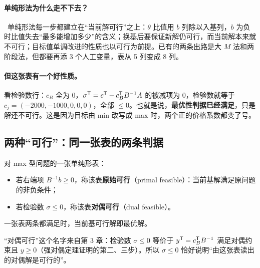 \paragraph{单纯形法为什么走不下去？}\ 单纯形法每一步都建立在“当前解可行”之上：$\theta$ 比值用 $b$ 列除以入基列，$b$ 为负时比值失去“最多能增加多少”的含义；换基后要保证新解仍可行，而当前解本来就不可行；目标值单调改进的性质也以可行为前提。已有的两条出路是大 $M$ 法和两阶段法，但都要再添 3 个人工变量，表从 5 列变成 8 列。

\paragraph{但这张表有一个好性质。}看检验数行：$c_B$ 全为 0，$\sigma^{\mathsf T}=c^{\mathsf T}-c_B^{\mathsf T} B^{-1}A$ 的被减项为 0，检验数就等于 $c_j=(-2000,-1000,0,0,0)$，全部 $\le0$。也就是说，\textbf{最优性判据已经满足}，只是解还不可行。这是因为目标由 min 改写成 max 时，两个正的价格系数都变了号。

\subsection{两种“可行”：同一张表的两条判据}

\begin{definitionbox}
对 max 型问题的一张单纯形表：
\begin{itemize}
  \item 若右端项 $B^{-1}b\ge0$，称该表\textbf{原始可行}（primal feasible）：当前基解满足原问题的非负条件；
  \item 若检验数 $\sigma\le0$，称该表\textbf{对偶可行}（dual feasible）。
\end{itemize}
一张表两条都满足时，当前基可行解即最优解。
\end{definitionbox}

“对偶可行”这个名字来自第 3 章：检验数 $\sigma\le0$ 等价于 $y^{\mathsf T}=c_B^{\mathsf T} B^{-1}$ 满足对偶约束且 $y\ge0$（强对偶定理证明的第二、三步）。所以 $\sigma\le0$ 恰好说明“由这张表读出的对偶解是可行的”。

\begin{figure}[!htbp]\centering
{}
\label{fig:twopath}
\end{figure}

